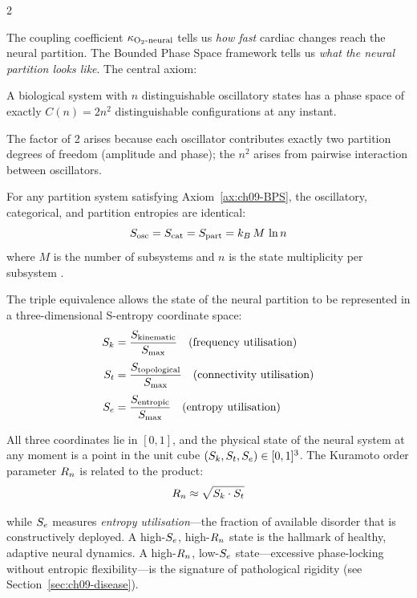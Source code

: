 \begin{multicols}{2}

The coupling coefficient $\kappa_{\mathrm{O_2\text{-}neural}}$ tells us \emph{how fast} cardiac
changes reach the neural partition. The Bounded Phase Space framework
tells us \emph{what the neural partition looks like}. The central
axiom:

\begin{axiom}
\label{ax:ch09-BPS}
A biological system with $n$ distinguishable oscillatory states has a
phase space of exactly $C(n) = 2n^2$ distinguishable configurations
at any instant.
\end{axiom}

The factor of 2 arises because each oscillator contributes exactly
two partition degrees of freedom (amplitude and phase); the $n^2$
arises from pairwise interaction between oscillators.

\begin{theorem}
\label{thm:ch09-triple}
For any partition system satisfying Axiom~\ref{ax:ch09-BPS}, the
oscillatory, categorical, and partition entropies are identical:
\begin{equation}
S_{\mathrm{osc}} = S_{\mathrm{cat}} = S_{\mathrm{part}} = k_B\,M\,\ln n
\label{eq:ch09-triple}
\end{equation}
where $M$ is the number of subsystems and $n$ is the state multiplicity
per subsystem \citep{sachikonye2024_cardioneural}.
\end{theorem}

\columnbreak

The triple equivalence allows the state of the neural partition to be
represented in a three-dimensional S-entropy coordinate space:
\begin{align}
S_k &= \frac{S_{\mathrm{kinematic}}}{S_{\max}} \quad \text{(frequency utilisation)} \label{eq:ch09-Sk} \\[3pt]
S_t &= \frac{S_{\mathrm{topological}}}{S_{\max}} \quad \text{(connectivity utilisation)} \label{eq:ch09-St} \\[3pt]
S_e &= \frac{S_{\mathrm{entropic}}}{S_{\max}} \quad \text{(entropy utilisation)} \label{eq:ch09-Se}
\end{align}

All three coordinates lie in $[0,1]$, and the physical state of the
neural system at any moment is a point in the unit cube
$(S_k, S_t, S_e) \in [0,1]^3$. The Kuramoto order parameter $R_n$
is related to the product:
\begin{equation}
R_n \approx \sqrt{S_k \cdot S_t}
\label{eq:ch09-Rn}
\end{equation}

while $S_e$ measures \emph{entropy utilisation}---the fraction of
available disorder that is constructively deployed. A high-$S_e$,
high-$R_n$ state is the hallmark of healthy, adaptive neural
dynamics. A high-$R_n$, low-$S_e$ state---excessive phase-locking
without entropic flexibility---is the signature of pathological
rigidity (see Section~\ref{sec:ch09-disease}).

\end{multicols}

